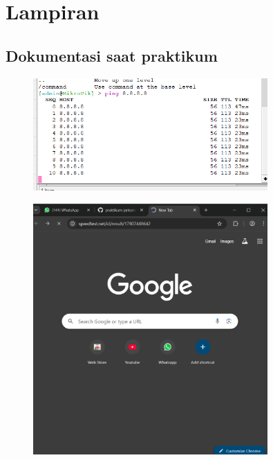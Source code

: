 \section{Lampiran}
\subsection{Dokumentasi saat praktikum}

\begin{figure}[H]
\centering
\includegraphics[width=0.8\textwidth]{P1/img/5.png}

\end{figure}
\begin{figure}[H]
\centering
\includegraphics[width=0.8\textwidth]{P1/img/6.png}

\end{figure}

